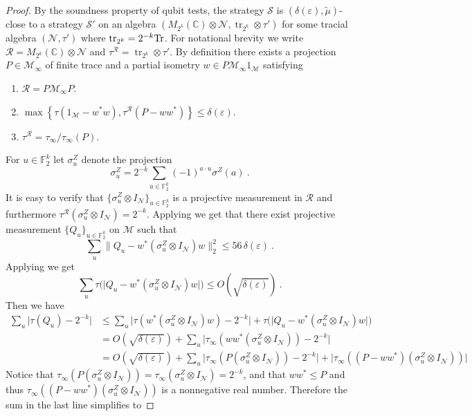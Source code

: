 \documentclass[11pt]{article}
\theoremstyle{definition}
\newcommand{\strategy}{\mathscr{S}}
\newcommand{\Tr}{\mbox{\rm Tr}}
\newcommand{\C}{\ensuremath{\mathbb{C}}}
\newcommand{\F}{\ensuremath{\mathbb{F}}}
\newcommand{\mM}{\ensuremath{\mathcal{M}}}
\newcommand{\mR}{\ensuremath{\mathcal{R}}}
\newcommand{\eps}{\varepsilon}
\newcommand{\mN}{\mathcal{N}}
\DeclareMathOperator{\tr}{tr}
\begin{document}
\begin{proof}
By the soundness property of qubit tests, the strategy $\strategy$ is $(\delta(\eps),\tilde{\mu})$-close  to a strategy $\strategy'$ on an algebra $(M_{2^k}(\C) \otimes \mN,\tr_{2^k} \otimes \tau')$ for some tracial algebra $(\mN,\tau')$ where $\tr_{2^k} = 2^{-k} \Tr$. For notational brevity we write $\mR = M_{2^k}(\C) \otimes \mN$ and $\tau^{\mR} = \tr_{2^k} \otimes \tau'$. By definition there exists a projection $P \in \mM_\infty$ of finite trace and a partial isometry $w \in P \mM_\infty 1_\mM$ satisfying
\begin{enumerate}
	\item $\mR = P \mM_\infty P$. 
	\item $\max \left \{ \tau(1_\mM - w^* w), \tau^{\mR} (P - w w^*) \right \} \leq \delta(\eps)$.
	\item $\tau^{\mR} = \tau_\infty/\tau_\infty(P)$.
\end{enumerate}
For $u \in \F_2^k$ let $\sigma^Z_u$ denote the projection
\[
	\sigma^Z_u = 2^{-k} \sum_{a \in \F_2^k} (-1)^{a \cdot u} \sigma^Z(a)~.
\]
It is easy to verify that $\{\sigma^Z_u \otimes I_\mN \}_{u \in \F_2^k}$ is a projective measurement in $\mR$ and furthermore $\tau^{\mR}(\sigma^Z_u \otimes I_\mN) = 2^{-k}$. Applying  we get that there exist projective measurement $\{Q_u\}_{u \in \F_2^k}$ on $\mM$ such that
\[
	\sum_u \| Q_u - w^* (\sigma^Z_u \otimes I_\mN) w \|_2^2 \leq 56\, \delta(\eps)~.
\]
Applying  we get
\[
	\sum_u \tau \Big ( \Big| Q_u - w^* (\sigma^Z_u \otimes I_\mN) w\Big| \Big) \leq O(\sqrt{\delta(\eps)})~.
\]
Then we have
\begin{align*}
	\sum_u \Big| \tau(Q_u) - 2^{-k} \Big| &\leq \sum_u \Big | \tau(w^* (\sigma^Z_u \otimes I_\mN) w) - 2^{-k} \Big| + \tau \Big ( \Big| Q_u - w^* (\sigma^Z_u \otimes I_\mN) w\Big| \Big) \\
	&= O(\sqrt{\delta(\eps)}) + \sum_u \Big | \tau_\infty (w w^* (\sigma^Z_u \otimes I_\mN)) - 2^{-k} \Big| \\
	&= O(\sqrt{\delta(\eps)}) + \sum_u \Big | \tau_\infty (P (\sigma^Z_u \otimes I_\mN)) - 2^{-k} \Big| + \Big | \tau_\infty((P - ww^*)(\sigma^Z_u \otimes I_\mN)) \Big|
\end{align*}
Notice that $\tau_\infty (P (\sigma^Z_u \otimes I_\mN)) = \tau_\infty (\sigma^Z_u \otimes I_\mN) = 2^{-k}$, and that $ww^* \leq P$ and thus $\tau_\infty((P - ww^*)(\sigma^Z_u \otimes I_\mN))$ is a nonnegative real number. Therefore the sum in the last line simplifies to

\end{proof}
\end{document}
